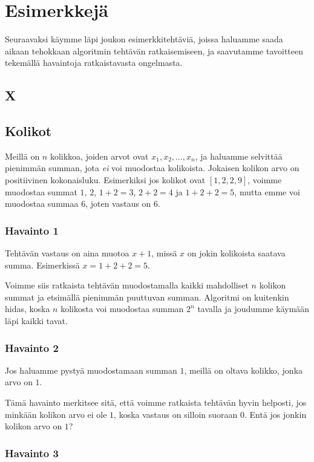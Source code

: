 \section{Esimerkkejä}

Seuraavaksi käymme läpi joukon esimerkkitehtäviä,
joissa haluamme saada aikaan tehokkaan algoritmin tehtävän ratkaisemiseen,
ja saavutamme tavoitteen tekemällä havaintoja ratkaistavasta ongelmasta.

\subsection{X}

\subsection{Kolikot}

Meillä on $n$ kolikkoa, joiden arvot ovat $x_1,x_2,\dots,x_n$,
ja haluamme selvittää pienimmän summan, jota \emph{ei} voi muodostaa kolikoista.
Jokaisen kolikon arvo on positiivinen kokonaisluku.
Esimerkiksi jos kolikot ovat $[1,2,2,9]$, voimme muodostaa summat
$1$, $2$, $1+2=3$, $2+2=4$ ja $1+2+2=5$,
mutta emme voi muodostaa summaa $6$, joten vastaus on $6$.

\subsubsection{Havainto 1}

Tehtävän vastaus on aina muotoa $x+1$, missä $x$ on jokin kolikoista
saatava summa.
Esimerkissä $x=1+2+2=5$.

Voimme siis ratkaista tehtävän
muodostamalla kaikki mahdolliset $n$ kolikon summat
ja etsimällä pienimmän puuttuvan summan.
Algoritmi on kuitenkin hidas, koska $n$ kolikosta voi
muodostaa summan $2^n$ tavalla ja joudumme käymään läpi kaikki tavat.

\subsubsection{Havainto 2}

Jos haluamme pystyä muodostamaan summan $1$,
meillä on oltava kolikko, jonka arvo on $1$.

Tämä havainto merkitsee sitä, että voimme ratkaista tehtävän
hyvin helposti, jos minkään kolikon arvo ei ole $1$,
koska vastaus on silloin suoraan $0$.
Entä jos jonkin kolikon arvo on $1$?

\subsubsection{Havainto 3}

